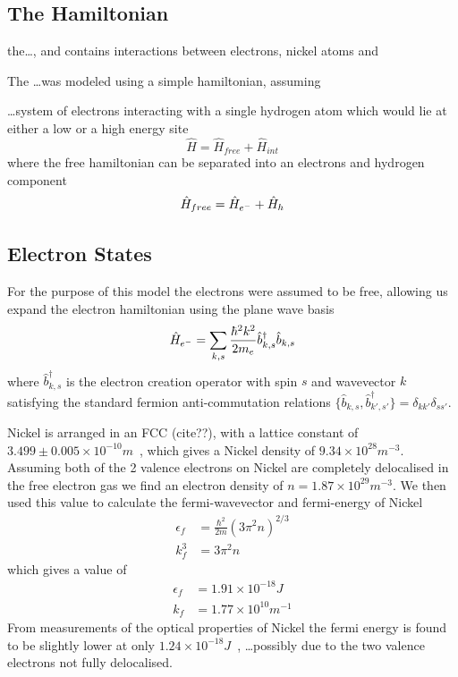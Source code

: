 \subsection{The Hamiltonian}
the\ldots, and contains interactions between
electrons, nickel atoms and



The \ldots was modeled using a simple
hamiltonian, assuming



\ldots system of electrons interacting with
a single hydrogen atom which would lie at
either a low or a high energy site
\begin{equation}
  \hat{H} = \hat{H}_{free} + \hat{H}_{int}
\end{equation}
where the free hamiltonian can be separated
into an electrons and hydrogen component
\begin{equation}
  \hat{H}_{free} =
  \hat{H}_{e^-} + \hat{H}_{h}\\
\end{equation}

\subsection{Electron States}
For the purpose of this model the electrons
were assumed to be free, allowing
us expand the electron
hamiltonian using the plane wave
basis
\begin{equation}
  \hat{H}_{e^-} = \sum_{k, s}
  \frac{\hbar^2 k^2}{2m_e} \hat{b}^\dagger_{k, s} \hat{b}_{k, s}\\
\end{equation}
where \(\hat{b}^\dagger_{k, s}\)
is the electron creation operator
with spin \(s\) and wavevector
\(k\) satisfying the standard
fermion anti-commutation relations
\( \{ \hat{b}_{k, s}, \hat{b}^\dagger_{k', s'} \}
= \delta_{k k'} \delta_{s s'}\).

Nickel is arranged in an FCC (cite??),
with a lattice constant of
\(3.499\pm{}0.005\times{}10^{-10}m\)~\cite{PhysRev.25.753},
which gives a Nickel density of
\(9.34\times{}10^{28}m^{-3}\).
Assuming both of the 2 valence
electrons on Nickel are completely
delocalised in
the free electron gas we
find an electron density of
\(n = 1.87\times{}10^{29} m^{-3}\).
We then used this value to calculate
the fermi-wavevector and fermi-energy of
Nickel~\cite{KittelCharles1953Itss}
\begin{align}
  \epsilon_f & = \frac{\hbar^2}{2m} {(3\pi^2n)}^{2/3} \\
  k_f^3      & = 3 \pi^2 n
\end{align}
which gives a value of
\begin{align}
  \epsilon_f & = 1.91\times{}10^{-18}J     \\
  k_f        & = 1.77\times{}10^{10}m^{-1}
\end{align}
From measurements of the optical
properties of Nickel the
fermi energy is found to
be slightly lower
at only
\(1.24\times{} 10^{-18}J\)~\cite{PhysRev.131.2469},
\ldots possibly due to the two
valence electrons not fully delocalised.

